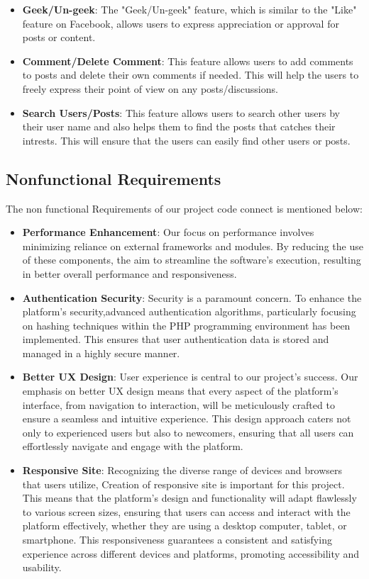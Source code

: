 \begin{itemize}
    \item \textbf{Geek/Un-geek}:
      The "Geek/Un-geek" feature, which is similar to the "Like" feature on Facebook, allows users to express appreciation or approval for posts or content. 

    \item \textbf{Comment/Delete Comment}:
      This feature allows users to add comments to posts and delete their own comments if needed. This will help the users to freely express their point of view on any posts/discussions. 

    \item \textbf{Search Users/Posts}:
    This feature allows users to search other users by their user name and also helps them to find the posts that catches their intrests. This will ensure that the users can easily find other users or posts.

  \end{itemize}
\subsection{Nonfunctional Requirements}
The non functional Requirements of our project code connect is mentioned below:
\begin{itemize}
    \item \textbf{Performance Enhancement}: Our focus on performance involves minimizing reliance on external frameworks and modules. By reducing the use of these components, the aim to streamline the software's execution, resulting in better overall performance and responsiveness.
    \item \textbf{Authentication Security}: Security is a paramount concern. To enhance the platform's security,advanced authentication algorithms, particularly focusing on hashing techniques within the PHP programming environment has been implemented. This ensures that user authentication data is stored and managed in a highly secure manner.
    \item \textbf{Better UX Design}: User experience is central to our project's success. Our emphasis on better UX design means that every aspect of the platform's interface, from navigation to interaction, will be meticulously crafted to ensure a seamless and intuitive experience. This design approach caters not only to experienced users but also to newcomers, ensuring that all users can effortlessly navigate and engage with the platform.
    \item \textbf{Responsive Site}: Recognizing the diverse range of devices and browsers that users utilize, Creation of responsive site is important for this project. This means that the platform's design and functionality will adapt flawlessly to various screen sizes, ensuring that users can access and interact with the platform effectively, whether they are using a desktop computer, tablet, or smartphone. This responsiveness guarantees a consistent and satisfying experience across different devices and platforms, promoting accessibility and usability.
    
  \end{itemize}
